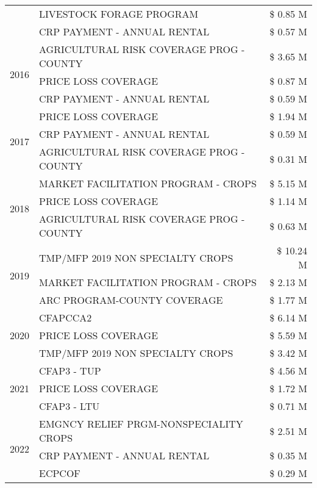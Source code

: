 \begin{tabular}{llr}
 & LIVESTOCK FORAGE PROGRAM & \$ 0.85 M \\
 & CRP PAYMENT - ANNUAL RENTAL & \$ 0.57 M \\
\cline{1-3}
\multirow[t]{3}{*}{2016} & AGRICULTURAL RISK COVERAGE PROG - COUNTY & \$ 3.65 M \\
 & PRICE LOSS COVERAGE & \$ 0.87 M \\
 & CRP PAYMENT - ANNUAL RENTAL & \$ 0.59 M \\
\cline{1-3}
\multirow[t]{3}{*}{2017} & PRICE LOSS COVERAGE & \$ 1.94 M \\
 & CRP PAYMENT - ANNUAL RENTAL & \$ 0.59 M \\
 & AGRICULTURAL RISK COVERAGE PROG - COUNTY & \$ 0.31 M \\
\cline{1-3}
\multirow[t]{3}{*}{2018} & MARKET FACILITATION PROGRAM - CROPS & \$ 5.15 M \\
 & PRICE LOSS COVERAGE & \$ 1.14 M \\
 & AGRICULTURAL RISK COVERAGE PROG - COUNTY & \$ 0.63 M \\
\cline{1-3}
\multirow[t]{3}{*}{2019} & TMP/MFP 2019 NON SPECIALTY CROPS & \$ 10.24 M \\
 & MARKET FACILITATION PROGRAM - CROPS & \$ 2.13 M \\
 & ARC PROGRAM-COUNTY COVERAGE & \$ 1.77 M \\
\cline{1-3}
\multirow[t]{3}{*}{2020} & CFAPCCA2 & \$ 6.14 M \\
 & PRICE LOSS COVERAGE & \$ 5.59 M \\
 & TMP/MFP 2019 NON SPECIALTY CROPS & \$ 3.42 M \\
\cline{1-3}
\multirow[t]{3}{*}{2021} & CFAP3 - TUP & \$ 4.56 M \\
 & PRICE LOSS COVERAGE & \$ 1.72 M \\
 & CFAP3 - LTU & \$ 0.71 M \\
\cline{1-3}
\multirow[t]{3}{*}{2022} & EMGNCY RELIEF PRGM-NONSPECIALITY CROPS & \$ 2.51 M \\
 & CRP PAYMENT - ANNUAL RENTAL & \$ 0.35 M \\
 & ECPCOF & \$ 0.29 M \\
\cline{1-3}
\bottomrule
\end{tabular}
